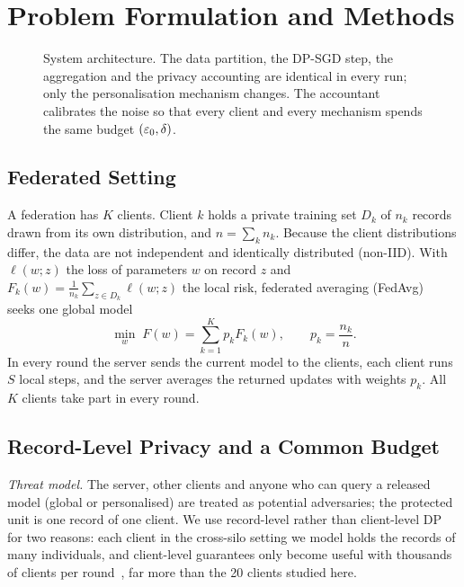 \section{Problem Formulation and Methods}\label{sec:method}

\begin{figure}[!t]
\centering
{}
\caption{System architecture. The data partition, the DP-SGD step, the aggregation and the privacy accounting are
identical in every run; only the personalisation mechanism changes. The accountant calibrates the noise so that every
client and every mechanism spends the same budget $(\varepsilon_0,\delta)$.}
\label{fig:architecture}
\end{figure}

\subsection{Federated Setting}
A federation has $K$ clients. Client $k$ holds a private training set $D_k$ of $n_k$ records drawn from its own
distribution, and $n=\sum_k n_k$. Because the client distributions differ, the data are not independent and
identically distributed (non-IID). With $\ell(w;z)$ the loss of parameters $w$ on record $z$ and
$F_k(w)=\frac{1}{n_k}\sum_{z\in D_k}\ell(w;z)$ the local risk, federated averaging (FedAvg)~\cite{mcmahan2017communication}
seeks one global model
\begin{equation}
\min_{w}\; F(w)=\sum_{k=1}^{K} p_k F_k(w), \qquad p_k=\frac{n_k}{n}. \label{eq:fedavg}
\end{equation}
In every round the server sends the current model to the clients, each client runs $S$ local steps, and the server
averages the returned updates with weights $p_k$. All $K$ clients take part in every round.

\subsection{Record-Level Privacy and a Common Budget}
\emph{Threat model.} The server, other clients and anyone who can query a released model (global or personalised)
are treated as potential adversaries; the protected unit is one record of one client. We use record-level rather
than client-level DP for two reasons: each client in the cross-silo setting we model holds the records of many
individuals, and client-level guarantees only become useful with thousands of clients per
round~\cite{kairouz2021advances}, far more than the 20 clients studied here.

